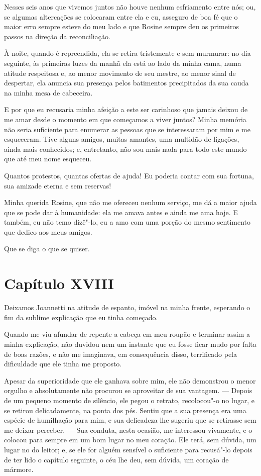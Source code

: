  Nesses seis anos que vivemos juntos não houve nenhum esfriamento entre
nós; ou, se algumas altercações se colocaram entre ela e eu, asseguro
de boa fé que o maior erro sempre esteve do meu lado e que Rosine
sempre deu os primeiros passos na direção da reconciliação.

 À noite, quando é repreendida, ela se retira tristemente e sem
murmurar: no dia seguinte, às primeiras luzes da manhã ela está ao lado
da minha cama, numa atitude respeitosa e, ao menor movimento de seu
mestre, ao menor sinal de despertar, ela anuncia sua presença pelos
batimentos precipitados da sua cauda na minha mesa de cabeceira.

 E por que eu recusaria minha afeição a este ser carinhoso que jamais
deixou de me amar desde o momento em que começamos a viver juntos?
Minha memória não seria suficiente para enumerar as pessoas que se
interessaram por mim e me esqueceram. Tive alguns amigos, muitas
amantes, uma multidão de ligações, ainda mais conhecidos; e,
entretanto, não sou mais nada para todo este mundo que até meu nome
esqueceu.

 Quantos protestos, quantas ofertas de ajuda! Eu poderia contar com sua
fortuna, sua amizade eterna e sem reservas!

 Minha querida Rosine, que não me ofereceu nenhum serviço, me dá a maior
ajuda que se pode dar à humanidade: ela me amava antes e ainda me ama
hoje. E também, eu não temo dizê"-lo, eu a amo com uma porção do mesmo
sentimento que dedico aos meus amigos.

 Que se diga o que se quiser.

\section*{Capítulo XVIII}

 Deixamos Joannetti na atitude de espanto, imóvel na minha frente,
esperando o fim da sublime explicação que eu tinha começado.

 Quando me viu afundar de repente a cabeça em meu roupão e terminar
assim a minha explicação, não duvidou nem um instante que eu fosse
ficar mudo por falta de boas razões, e não me imaginava, em
consequência disso, terrificado pela dificuldade que ele tinha me
proposto.

  Apesar da superioridade que ele ganhava sobre mim, ele não demonstrou
o menor orgulho e absolutamente não procurou se aproveitar de sua
vantagem. --- Depois de um pequeno momento de silêncio, ele pegou o
retrato, recolocou"-o no lugar, e se retirou delicadamente, na ponta dos
pés. Sentiu que a sua presença era uma espécie de humilhação para mim,
e sua delicadeza lhe sugeriu que se retirasse sem me deixar perceber.
--- Sua conduta, nesta ocasião, me interessou vivamente, e o colocou
para sempre em um bom lugar no meu coração. Ele terá, sem dúvida, um
lugar no do leitor; e, se ele for alguém sensível o suficiente para
recusá"-lo depois de ter lido o capítulo seguinte, o céu lhe deu, sem
dúvida, um coração de mármore.

